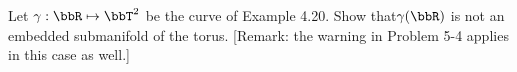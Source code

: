 Let $\gamma:\bbR\mapsto\bbT^2$ be the curve of Example 4.20.  Show that$\gamma(\bbR)$ is not an embedded submanifold of the torus. [Remark: the warning in Problem 5-4 applies in this case as well.]
